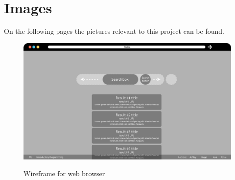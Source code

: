 \chapter{Images}
\label{app:images}
On the following pages the pictures relevant to this project can be found.

\begin{figure}
    \centering
    \caption{Wireframe for web browser}
    \includegraphics[scale=0.3]{figures/Wireframe_for_fullsize_webbrower.PNG}
    \label{fig:WireframeBrowser}
\end{figure}


